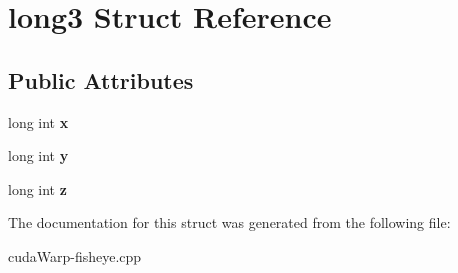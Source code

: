 \hypertarget{structlong3}{}\section{long3 Struct Reference}
\label{structlong3}
\subsection*{Public Attributes}
\begin{DoxyCompactItemize}
\item 
long int {\bfseries x}\hypertarget{structlong3_a659d9e1e6c918cd92609a707b9035203}{}\label{structlong3_a659d9e1e6c918cd92609a707b9035203}

\item 
long int {\bfseries y}\hypertarget{structlong3_a508f9e0eff6e62e44fccfaeee7648ce0}{}\label{structlong3_a508f9e0eff6e62e44fccfaeee7648ce0}

\item 
long int {\bfseries z}\hypertarget{structlong3_a0b5fe68b343e7d28b59fc7774973a9a9}{}\label{structlong3_a0b5fe68b343e7d28b59fc7774973a9a9}

\end{DoxyCompactItemize}


The documentation for this struct was generated from the following file\+:\begin{DoxyCompactItemize}
\item 
cuda\+Warp-\/fisheye.\+cpp\end{DoxyCompactItemize}
